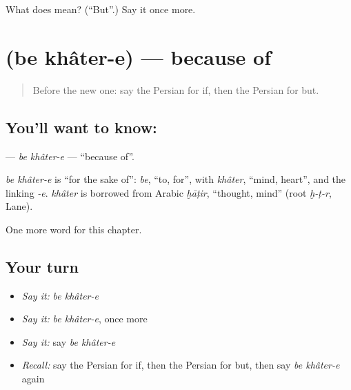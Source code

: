 \begin{tcolorbox}[breakable,colback=teal!4,colframe=teal!35!black,title={Before you move on}]
What does  mean? (\textquotedblleft{}But\textquotedblright{}.) Say it once more.
\end{tcolorbox}
\section[\texorpdfstring{\fa{به} \fa{خاطر} (be khâter-e)}{به خاطر (be khâter-e)}]{  (be khâter-e) — because of}

\label{lesson:FA-C158-be-khater-e}



\begin{quote}
Before the new one: say the Persian for if, then the Persian for but.
\end{quote}

\subsection*{You'll want to know:  }
\textbf{ } — \emph{be khâter-e} — \textquotedblleft{}because of\textquotedblright{}.

\begin{cousinweb}
\emph{be khâter-e} is \textquotedblleft{}for the sake of\textquotedblright{}: \emph{be}, \textquotedblleft{}to, for\textquotedblright{}, with \emph{khâter}, \textquotedblleft{}mind, heart\textquotedblright{}, and the linking \emph{-e}. \emph{khâter} is borrowed from Arabic \emph{ḫāṭir}, \textquotedblleft{}thought, mind\textquotedblright{} (root \emph{ḫ-ṭ-r}, Lane).
\end{cousinweb}

\begin{grammarlens}[title={What you've built}]
One more word for this chapter.
\end{grammarlens}

\subsection*{Your turn}
\begin{itemize}
\raggedright
  \item \emph{Say it:} \emph{be khâter-e}
  \item \emph{Say it:} \emph{be khâter-e}, once more
  \item \emph{Say it:} say \emph{be khâter-e}
  \item \emph{Recall:} say the Persian for if, then the Persian for but, then say \emph{be khâter-e} again
\end{itemize}

